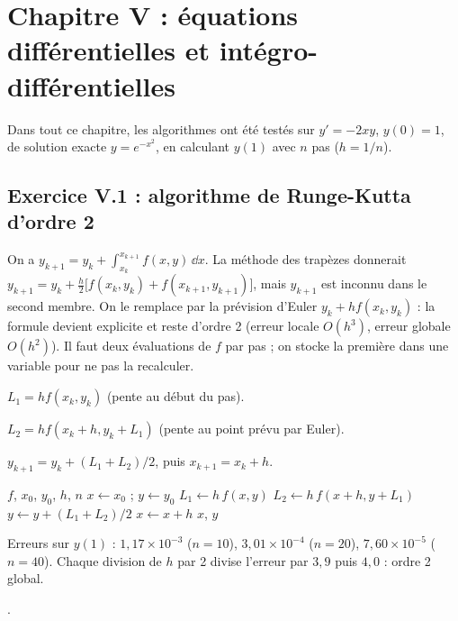 \chapter{Chapitre V : équations différentielles et intégro-différentielles}

Dans tout ce chapitre, les algorithmes ont été testés sur
$y' = -2xy$, $y(0) = 1$, de solution exacte $y = e^{-x^2}$, en calculant
$y(1)$ avec $n$ pas ($h = 1/n$).

\section{Exercice V.1 : algorithme de Runge-Kutta d'ordre 2}


\Pourquoi On a $y_{k+1} = y_k + \int_{x_k}^{x_{k+1}} f(x,y)\,\dd x$. La
méthode des trapèzes donnerait
$y_{k+1} = y_k + \tfrac h2\bigl[f(x_k,y_k) + f(x_{k+1},y_{k+1})\bigr]$, mais
$y_{k+1}$ est inconnu dans le second membre. On le remplace par la prévision
d'Euler $y_k + hf(x_k,y_k)$ : la formule devient explicite et reste d'ordre 2
(erreur locale $O(h^3)$, erreur globale $O(h^2)$). Il faut deux évaluations
de $f$ par pas ; on stocke la première dans une variable pour ne pas la
recalculer.

\Etapes
{} $L_1 = hf(x_k, y_k)$ (pente au début du pas).

 $L_2 = hf(x_k + h, y_k + L_1)$ (pente au point prévu par Euler).

 $y_{k+1} = y_k + (L_1 + L_2)/2$, puis $x_{k+1} = x_k + h$.

\begin{algo}
  \Require $f$, $x_0$, $y_0$, $h$, $n$
  \State $x \leftarrow x_0$ ; $y \leftarrow y_0$
    \State $L_1 \leftarrow h\,f(x, y)$
    \State $L_2 \leftarrow h\,f(x + h, y + L_1)$
    \State $y \leftarrow y + (L_1 + L_2)/2$
    \State $x \leftarrow x + h$
    \Print $x$, $y$
  \EndFor
\end{algo}

\Verif Erreurs sur $y(1)$ : $1{,}17\times 10^{-3}$ ($n = 10$),
$3{,}01\times 10^{-4}$ ($n = 20$), $7{,}60\times 10^{-5}$ ($n = 40$). Chaque
division de $h$ par 2 divise l'erreur par $3{,}9$ puis $4{,}0$ : ordre 2
global.

\Refs {}.

